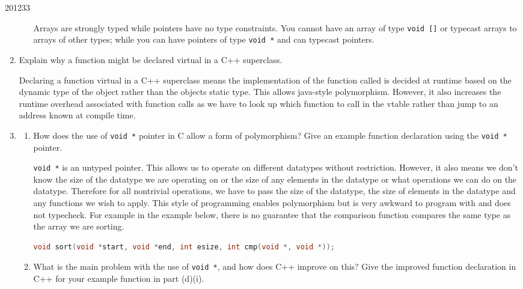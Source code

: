 \documentclass[10pt,\jkfside,a4paper]{article}
\begin{document}
\begin{examquestion}{2012}{3}{3}
\begin{enumerate}[label=(\alph*)]
\begin{enumerate}[label=(\roman*)]
Arrays are strongly typed while pointers have no type constraints. You
cannot have an array of type \texttt{void []} or typecast arrays to arrays
of other types; while you can have pointers of type \texttt{void *} and
can typecast pointers.

\end{enumerate}

\item Explain why a function might be declared virtual in a C++ superclass.

Declaring a function virtual in a C++ superclass means the implementation
of the function called is decided at runtime based on the dynamic type of the
object rather than the objects static type. This allows java-style
polymorphism. However, it also increases the runtime overhead associated with
function calls as we have to look up which function to call in the vtable
rather than jump to an address known at compile time.

\item

\begin{enumerate}[label=(\roman*)]

\item How does the use of \texttt{void *} pointer in C allow a form of
polymorphism? Give an example function declaration using the \texttt{void *}
pointer.

\texttt{void *} is an untyped pointer. This allows us to operate on
different datatypes without restriction. However, it also means we don't
know the size of the datatype we are operating on or the size of any
elements in the datatype or what operations we can do on the datatype.
Therefore for all nontrivial operations, we have to pass the size of the
datatype, the size of elements in the datatype and any functions we wish to
apply. This style of programming enables polymorphism but is very awkward to
program with and does not typecheck. For example in the example below, there
is no guarantee that the comparison function compares the same type as the
array we are sorting.

\begin{lstlisting}[language=C]
void sort(void *start, void *end, int esize, int cmp(void *, void *));
\end{lstlisting}

\item What is the main problem with the use of \texttt{void *}, and how does
C++ improve on this? Give the improved function declaration in C++ for your
example function in part (d)(i).


\end{enumerate}
\end{enumerate}
\end{examquestion}
\end{document}
